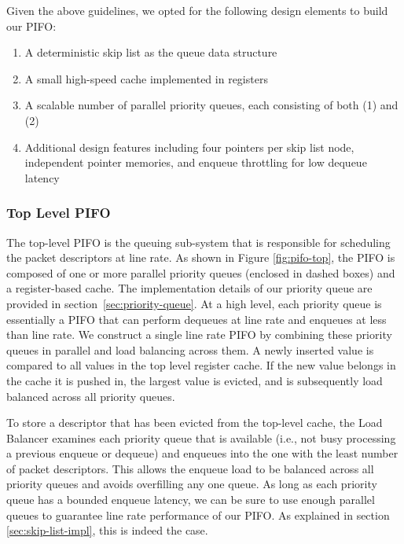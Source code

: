 Given the above guidelines, we opted for the following design elements to build our PIFO:
\begin{enumerate}
    \item A deterministic skip list as the queue data structure
    \item A small high-speed cache implemented in registers
    \item A scalable number of parallel priority queues, each consisting of both (1) and (2)
    \item Additional design features including four pointers per skip list node, independent pointer memories, and enqueue throttling for low dequeue latency
\end{enumerate}

\subsubsection{Top Level PIFO}\label{sec:pifo}

The top-level PIFO is the queuing sub-system that is responsible for scheduling the packet descriptors at line rate. As shown in Figure \ref{fig:pifo-top}, the PIFO is composed of one or more parallel priority queues (enclosed in dashed boxes) and a register-based cache. The implementation details of our priority queue are provided in section~\ref{sec:priority-queue}. At a high level, each priority queue is essentially a PIFO that can perform dequeues at line rate and enqueues at less than line rate.  We construct a single line rate PIFO by combining these priority queues in parallel and load balancing across them. A newly inserted value is compared to all values in the top level register cache. If the new value belongs in the cache it is pushed in, the largest value is evicted, and is subsequently load balanced across all priority queues.

To store a descriptor that has been evicted from the top-level cache, the Load Balancer examines each priority queue that is available (i.e., not busy processing a previous enqueue or dequeue) and enqueues into the one with the least number of packet descriptors. This allows the enqueue load to be balanced across all priority queues and avoids overfilling any one queue. As long as each priority queue has a bounded enqueue latency, we can be sure to use enough parallel queues to guarantee line rate performance of our PIFO. As explained in section \ref{sec:skip-list-impl}, this is indeed the case.

